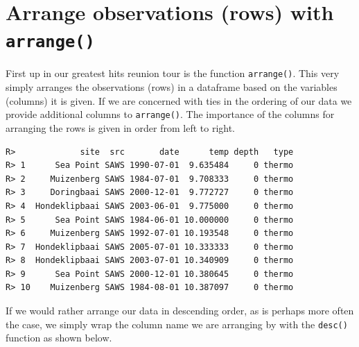 \documentclass[]{book}
\newenvironment{Shaded}{\begin{snugshade}}{\end{snugshade}}
\newcommand{\KeywordTok}[1]{\textcolor[rgb]{0.13,0.29,0.53}{\textbf{#1}}}
\newcommand{\StringTok}[1]{\textcolor[rgb]{0.31,0.60,0.02}{#1}}
\newcommand{\OperatorTok}[1]{\textcolor[rgb]{0.81,0.36,0.00}{\textbf{#1}}}
\newcommand{\NormalTok}[1]{#1}
\theoremstyle{definition}
\theoremstyle{definition}
\theoremstyle{definition}
\theoremstyle{remark}
\begin{document}
\section{\texorpdfstring{Arrange observations (rows) with
\texttt{arrange()}}{Arrange observations (rows) with arrange()}}\label{arrange-observations-rows-with-arrange}

First up in our greatest hits reunion tour is the function
\texttt{arrange()}. This very simply arranges the observations (rows) in
a dataframe based on the variables (columns) it is given. If we are
concerned with ties in the ordering of our data we provide additional
columns to \texttt{arrange()}. The importance of the columns for
arranging the rows is given in order from left to right.

\begin{Shaded}
\end{Shaded}

\begin{verbatim}
R>             site  src       date      temp depth   type
R> 1      Sea Point SAWS 1990-07-01  9.635484     0 thermo
R> 2     Muizenberg SAWS 1984-07-01  9.708333     0 thermo
R> 3     Doringbaai SAWS 2000-12-01  9.772727     0 thermo
R> 4  Hondeklipbaai SAWS 2003-06-01  9.775000     0 thermo
R> 5      Sea Point SAWS 1984-06-01 10.000000     0 thermo
R> 6     Muizenberg SAWS 1992-07-01 10.193548     0 thermo
R> 7  Hondeklipbaai SAWS 2005-07-01 10.333333     0 thermo
R> 8  Hondeklipbaai SAWS 2003-07-01 10.340909     0 thermo
R> 9      Sea Point SAWS 2000-12-01 10.380645     0 thermo
R> 10    Muizenberg SAWS 1984-08-01 10.387097     0 thermo
\end{verbatim}

If we would rather arrange our data in descending order, as is perhaps
more often the case, we simply wrap the column name we are arranging by
with the \texttt{desc()} function as shown below.

\begin{Shaded}
\end{Shaded}
\end{document}
